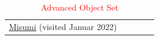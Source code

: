 {\begin{table}[h!]
\begin{tabular}{|c|m{2cm}|c|c|m{8cm}|}
		\href{https://us.misumi-ec.com/vona2/detail/110300236450/?curSearch=%7b%22field%22%3a%22%40search%22%2c%22seriesCode%22%3a%22110300236450%22%2c%22innerCode%22%3a%22%22%2c%22sort%22%3a1%2c%22specSortFlag%22%3a0%2c%22allSpecFlag%22%3a0%2c%22page%22%3a1%2c%22pageSize%22%3a%2260%22%2c%2200000042362%22%3a%22mig00000001500952%22%2c%2200000042368%22%3a%22b%22%2c%22jp000157843%22%3a%22mig00000000344081%22%2c%22jp000157846%22%3a%22mig00000001417174%22%2c%22jp000157851%22%3a%22mig00000000344088%22%2c%2200000334029%22%3a%2230%22%2c%2200000334032%22%3a%2270%22%2c%22typeCode%22%3a%22CLJHJ%22%2c%22fixedInfo%22%3a%22MDM0000085422111030023645020110476153310093415426696895%7c14%22%7d&Tab=preview}{Misumi}  (visited Januar 2022)\\
						\hline

\end{tabular}
\caption{\textcolor{red}{Advanced Object Set}}
\label{tab:new_objects1}
\end{table}


}
